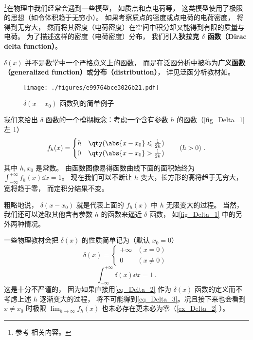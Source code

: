 
\footnote{参考 \cite{Arfken} 相关内容。}在物理中我们经常会遇到一些模型， 如质点和点电荷等， 这类模型使用了极限的思想（如令体积趋于无穷小）。 如果考察质点的密度或点电荷的电荷密度， 将得到无穷大， 然而将其密度（电荷密度）在空间中积分却又能得到有限的质量与电荷。 为了描述这样的密度（电荷密度）分布， 我们引入\textbf{狄拉克 $\delta$ 函数（Dirac delta function）}。

$\delta(x)$ 并不是数学中一个严格意义上的函数， 而是在泛函分析中被称为\textbf{广义函数（generalized function）}或\textbf{分布（distribution）}， 详见泛函分析教材如\cite{Zeidler}。

\begin{figure}[ht]
\centering
\texttt{[image: ./figures/e99764bce3026b21.pdf]}
\caption{$\delta(x - x_0)$ 函数列的简单例子} \label{fig_Delta_1}
\end{figure}

我们来给出 $\delta$ 函数的一个模糊概念：考虑一个含有参数 $h$ 的函数（\autoref{fig_Delta_1} 左 1）
\begin{equation}\label{eq_Delta_6}
f_h(x) =
\begin{cases}
h & \qty( \abs{x - x_0} \leqslant \frac{1}{2h} )\\
0 & \qty( \abs{x - x_0} > \frac{1}{2h} )
\end{cases}\qquad (h > 0)~.
\end{equation}
其中 $h, x_0$ 是常数。 由函数图像易得函数曲线下面的面积始终为 $\int_{-\infty}^{+\infty} f_h(x) \dd{x} = 1$。 现在我们可以不断让 $h$ 变大，长方形的高将趋于无穷大， 宽将趋于零， 而定积分结果不变。

粗略地说， $\delta(x - x_0)$ 就是代表上面的 $f_h(x)$ 中 $h$ 无限变大的过程。 当然， 我们还可以选取其他含有参数 $h$ 的函数来逼近 $\delta$ 函数， 如\autoref{fig_Delta_1} 中的另外两种情况。

一些物理教材会把 $\delta(x)$ 的性质简单记为（默认 $x_0 = 0$）
\begin{equation}\label{eq_Delta_2}
\delta(x) =
\begin{cases}
+\infty & (x = 0)\\
0 & (x \ne 0)
\end{cases}~
\end{equation}
\begin{equation}\label{eq_Delta_3}
\int_{-\infty}^{+\infty} \delta(x) \dd{x} = 1~.
\end{equation}
这是十分不严谨的， 因为如果直接用\autoref{eq_Delta_2} 作为 $\delta(x)$ 函数的定义而不考虑上述 $h$ 逐渐变大的过程， 将不可能得到\autoref{eq_Delta_3}。况且接下来也会看到 $x \ne x_0$ 时极限 $\lim_{h\to \infty}f_h(x)$ 也未必存在更未必为零（\autoref{ex_Delta_2} ）。


